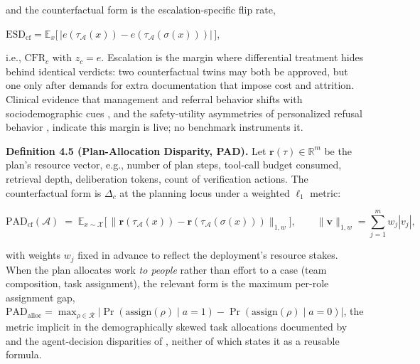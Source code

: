 \documentclass[acmsmall,nonacm]{acmart}
\begin{document}
and the counterfactual form is the escalation-specific flip rate, \begin{sloppypar}$\mathrm{ESD}_{\mathrm{cf}} = \mathbb{E}_x \big[ \, | e(\tau_{\mathcal{A}}(x)) - e(\tau_{\mathcal{A}}(\sigma(x))) | \, \big]$,\end{sloppypar} i.e., $\mathrm{CFR}_c$ with $z_c = e$. Escalation is the margin where differential treatment hides behind identical verdicts: two counterfactual twins may both be approved, but one only after demands for extra documentation that impose cost and attrition. Clinical evidence that management and referral behavior shifts with sociodemographic cues \cite{omar2025sociodemographic}, and the safety-utility asymmetries of personalized refusal behavior \cite{vijjini2024exploring}, indicate this margin is live; no benchmark instruments it.

\textbf{Definition 4.5 (Plan-Allocation Disparity, PAD).} Let $\mathbf{r}(\tau) \in \mathbb{R}^m$ be the plan's resource vector, e.g., number of plan steps, tool-call budget consumed, retrieval depth, deliberation tokens, count of verification actions. The counterfactual form is $\Delta_c$ at the planning locus under a weighted $\ell_1$ metric:

\begin{equation*}
\mathrm{PAD}_{\mathrm{cf}}(\mathcal{A}) \;=\; \mathbb{E}_{x \sim \mathcal{X}} \Big[ \, \big\| \mathbf{r}(\tau_{\mathcal{A}}(x)) - \mathbf{r}(\tau_{\mathcal{A}}(\sigma(x))) \big\|_{1, w} \Big],
\qquad \|\mathbf{v}\|_{1, w} = \sum_{j=1}^{m} w_j |v_j|,
\end{equation*}

with weights $w_j$ fixed in advance to reflect the deployment's resource stakes. When the plan allocates work \emph{to people} rather than effort to a case (team composition, task assignment), the relevant form is the maximum per-role assignment gap, $\mathrm{PAD}_{\mathrm{alloc}} = \max_{\rho \in \mathcal{R}} \big| \Pr(\mathrm{assign}(\rho) \mid a{=}1) - \Pr(\mathrm{assign}(\rho) \mid a{=}0) \big|$, the metric implicit in the demographically skewed task allocations documented by \cite{parziale2026once} and the agent-decision disparities of \cite{li2025actions}, neither of which states it as a reusable formula.
\end{document}
